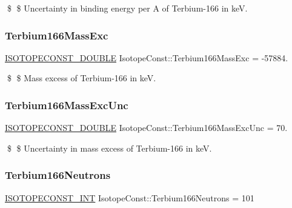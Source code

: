 \$ \$ Uncertainty in binding energy per A of Terbium-\/166 in keV. \mbox{\label{group___isotope_const-_terbium-_tb166_gaf43cef5b701d463909bd5b761a12f212}} 
\subsubsection{\texorpdfstring{Terbium166\+Mass\+Exc}{Terbium166MassExc}}
{\footnotesize\ttfamily \mbox{\hyperlink{group___isotope_const-_macros_ga8f45a7272ce02c0b4c65c44636ed719a}{I\+S\+O\+T\+O\+P\+E\+C\+O\+N\+S\+T\+\_\+\+D\+O\+U\+B\+LE}} Isotope\+Const\+::\+Terbium166\+Mass\+Exc = -\/57884.}

\$ \$ Mass excess of Terbium-\/166 in keV. \mbox{\label{group___isotope_const-_terbium-_tb166_ga669689840b52d76c3c37579975189f50}} 
\subsubsection{\texorpdfstring{Terbium166\+Mass\+Exc\+Unc}{Terbium166MassExcUnc}}
{\footnotesize\ttfamily \mbox{\hyperlink{group___isotope_const-_macros_ga8f45a7272ce02c0b4c65c44636ed719a}{I\+S\+O\+T\+O\+P\+E\+C\+O\+N\+S\+T\+\_\+\+D\+O\+U\+B\+LE}} Isotope\+Const\+::\+Terbium166\+Mass\+Exc\+Unc = 70.}

\$ \$ Uncertainty in mass excess of Terbium-\/166 in keV. \mbox{\label{group___isotope_const-_terbium-_tb166_ga98547d111aa36cca2e32aa0c5e215a89}} 
\subsubsection{\texorpdfstring{Terbium166\+Neutrons}{Terbium166Neutrons}}
{\footnotesize\ttfamily \mbox{\hyperlink{group___isotope_const-_macros_ga5f18360b3e99483a35c32d789e62621c}{I\+S\+O\+T\+O\+P\+E\+C\+O\+N\+S\+T\+\_\+\+I\+NT}} Isotope\+Const\+::\+Terbium166\+Neutrons = 101}

